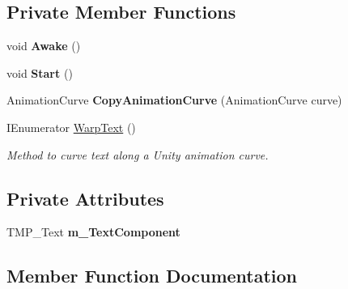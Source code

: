 \subsection*{Private Member Functions}
\begin{DoxyCompactItemize}
\item 
\mbox{\label{class_t_m_pro_1_1_examples_1_1_skew_text_example_a41d450e8d1c6f1a3ccc8b5271d6848a0}} 
void {\bfseries Awake} ()
\item 
\mbox{\label{class_t_m_pro_1_1_examples_1_1_skew_text_example_adfeed651f0d70d892c912023307430fa}} 
void {\bfseries Start} ()
\item 
\mbox{\label{class_t_m_pro_1_1_examples_1_1_skew_text_example_a71e40729ea55367d244f8cbb3a8409fc}} 
Animation\+Curve {\bfseries Copy\+Animation\+Curve} (Animation\+Curve curve)
\item 
I\+Enumerator \hyperlink{class_t_m_pro_1_1_examples_1_1_skew_text_example_ab944d8c8f98e214fdfd3953b3dad67c1}{Warp\+Text} ()
\begin{DoxyCompactList}\small\item\em Method to curve text along a Unity animation curve. \end{DoxyCompactList}\end{DoxyCompactItemize}
\subsection*{Private Attributes}
\begin{DoxyCompactItemize}
\item 
\mbox{\label{class_t_m_pro_1_1_examples_1_1_skew_text_example_a2c7d525575e9efa7c051bc88190c220c}} 
T\+M\+P\+\_\+\+Text {\bfseries m\+\_\+\+Text\+Component}
\end{DoxyCompactItemize}


\subsection{Member Function Documentation}
\mbox{\label{class_t_m_pro_1_1_examples_1_1_skew_text_example_ab944d8c8f98e214fdfd3953b3dad67c1}} 
